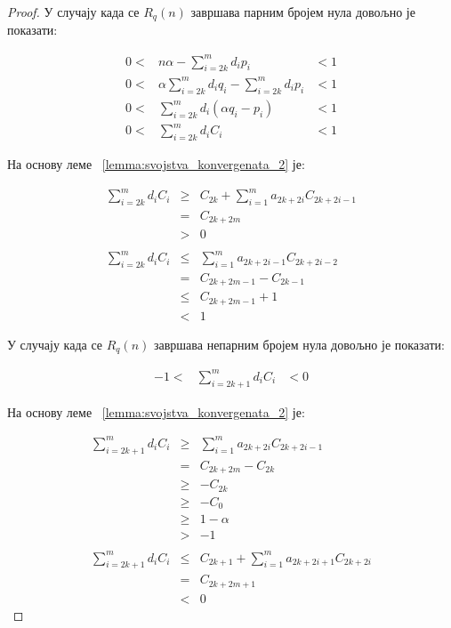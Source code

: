 \documentclass[a4paper]{article}
\begin{document}
\begin{proof}
	У случају када се $ R_q(n) $ завршава парним бројем нула довољно је показати:
	
	\begin{eqnarray*}
		0 <& n\alpha - \sum_{i = 2k}^{m} d_{i}p_{i} &< 1\\
		0 <& \alpha \sum_{i = 2k}^{m} d_{i}q_{i} - \sum_{i = 2k}^{m} d_{i}p_{i} &< 1\\
		0 <& \sum_{i = 2k}^{m} d_{i}(\alpha q_{i} - p_{i}) &< 1\\
		0 <& \sum_{i = 2k}^{m} d_{i}C_{i} &< 1
	\end{eqnarray*}
	
	На основу леме ~\eqref{lemma:svojstva_konvergenata_2} је:
	
	\begin{eqnarray*}
		\sum_{i = 2k}^{m} d_{i}C_{i} &\geq& C_{2k} + \sum_{i=1}^{m}a_{2k+2i}C_{2k+2i-1}\\ 
		&=& C_{2k+2m}\\ 
		&>& 0\\\\
		\sum_{i = 2k}^{m} d_{i}C_{i} &\leq& \sum_{i=1}^{m}a_{2k+2i-1}C_{2k+2i-2}\\ 
		&=& C_{2k+2m-1} - C_{2k-1}\\ 
		&\leq& C_{2k+2m-1} + 1\\ 
		&<& 1
	\end{eqnarray*}
	
	У случају када се $ R_q(n) $ завршава непарним бројем нула довољно је показати:
	
	\begin{eqnarray*}
		-1 <& \sum_{i = 2k+1}^{m} d_{i}C_{i} &< 0
	\end{eqnarray*}
	
	На основу леме ~\eqref{lemma:svojstva_konvergenata_2} је:
	
	\begin{eqnarray*}
		\sum_{i = 2k+1}^{m} d_{i}C_{i} &\geq& \sum_{i=1}^{m}a_{2k+2i}C_{2k+2i-1}\\ 
		&=& C_{2k+2m} - C_{2k}\\ 
		&\geq& -C_{2k}\\
		&\geq& -C_{0}\\
		&\geq& 1-\alpha\\
		&>& -1\\\\
		\sum_{i = 2k+1}^{m} d_{i}C_{i} &\leq& C_{2k+1} + \sum_{i=1}^{m}a_{2k+2i+1}C_{2k+2i}\\ 
		&=& C_{2k+2m+1}\\ 
		&<& 0
	\end{eqnarray*}
	
\end{proof}
\end{document}
